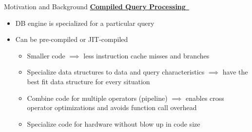 \begin{block}{Motivation and Background}
    \underline{\textbf{Compiled Query Processing}~\cite{SK16,N11}}
    \begin{itemize}
    \item DB engine is specialized for a particular query
    \item Can be pre-compiled or JIT-compiled
      \begin{itemize}
      \item Smaller code $\implies$ less instruction cache misses and branches
      \item Specialize data structures to data and query characteristics $\implies$ have the best fit data structure for every situation
      \item Combine code for multiple operators (pipeline) $\implies$ enables cross operator optimizations and avoids function call overhead
      \item Specialize code for hardware without blow up in code size
      \end{itemize}
    \end{itemize}
\end{block}


